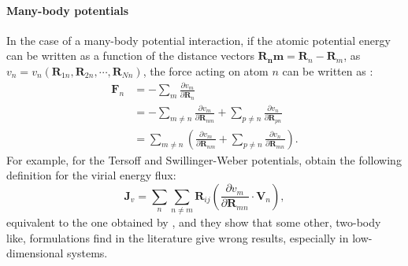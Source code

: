 \begin{LEtext}
\paragraph{Many-body potentials}
In the case of a many-body potential interaction, if the atomic potential energy can be written as a function of the distance vectors $\mathbf{R_nm}=\mathbf{R}_n-\mathbf{R}_m$, as $v_n = v_n(\mathbf{R}_{1n},\mathbf{R}_{2n},\cdots,\mathbf{R}_{Nn})$, the force acting on atom $n$ can be written as \cite{Fan2015,Hardy2016}:
\begin{align}
    \mathbf{F}_n &= -\sum_m \frac{\partial v_m}{\partial \mathbf{R}_n} \\
        &= -\sum_{m\neq n} \frac{\partial v_m}{\partial \mathbf{R}_{nm}} + \sum_{p\neq n} \frac{\partial v_n}{\partial \mathbf{R}_{pn}} \\
        &= \sum_{m\neq n} \left(\frac{\partial v_m}{\partial \mathbf{R}_{nm}} + \sum_{p\neq n} \frac{\partial v_n}{\partial \mathbf{R}_{mn}} \right).
\end{align}
For example, for the Tersoff \cite{Tersoff1989} and Swillinger-Weber \cite{Stillinger1985} potentials, \citet{Fan2015} obtain the following definition for the virial energy flux:
\begin{equation}
    \mathbf{J}_v = \sum_n \sum_{n\neq m} \mathbf{R}_{ij} \left(\frac{\partial v_m}{\partial \mathbf{R}_{mn}} \cdot \mathbf{V}_n \right) ,
\end{equation}
equivalent to the one obtained by \citet{Hardy1963}, and they show that some other, two-body like, formulations find in the literature give wrong results, especially in low-dimensional systems.

\end{LEtext}


